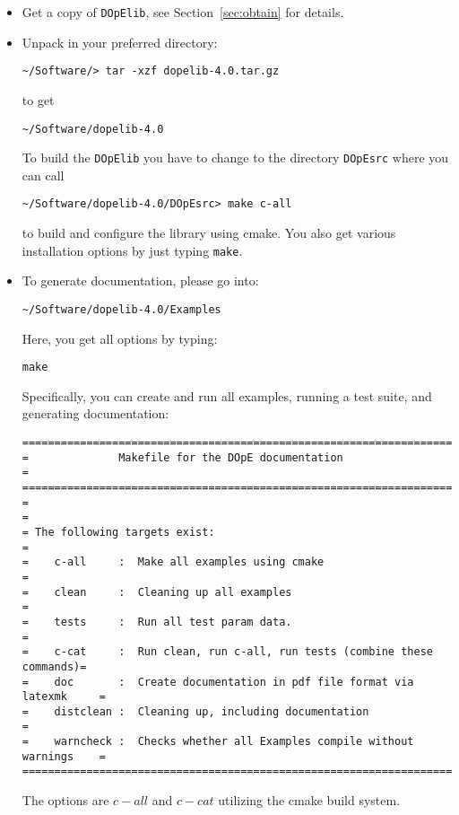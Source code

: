\begin{itemize}
%
\item Get a copy of \texttt{DOpElib}, see Section~\ref{sec:obtain} for details.
%
\item Unpack in your preferred directory:
\begin{lstlisting}
~/Software/> tar -xzf dopelib-4.0.tar.gz
\end{lstlisting}
to get
\begin{lstlisting}
~/Software/dopelib-4.0
\end{lstlisting}
To build the \texttt{DOpElib} you have to change to the directory 
\texttt{DOpEsrc} where you can call 
\begin{lstlisting}
~/Software/dopelib-4.0/DOpEsrc> make c-all
\end{lstlisting}
to build and configure the library using cmake. 
You also get various installation options by just typing 
\texttt{make}.
\item To generate documentation, please go into:
\begin{lstlisting}
~/Software/dopelib-4.0/Examples
\end{lstlisting}
Here, you get all options by typing:
\begin{lstlisting}
make
\end{lstlisting}
Specifically, you can create and run all examples, running a test suite,
and generating documentation:
{\footnotesize
\begin{lstlisting}
===========================================================================
=              Makefile for the DOpE documentation                        =
===========================================================================
=                                                                         =
= The following targets exist:                                            =
=    c-all     :  Make all examples using cmake                           =
=    clean     :  Cleaning up all examples                                =
=    tests     :  Run all test param data.                                =
=    c-cat     :  Run clean, run c-all, run tests (combine these commands)=
=    doc       :  Create documentation in pdf file format via latexmk     =
=    distclean :  Cleaning up, including documentation                    =
=    warncheck :  Checks whether all Examples compile without warnings    =
===========================================================================
\end{lstlisting}
}
The options are $c-all$ and $c-cat$ utilizing the cmake build system.


\end{itemize}
